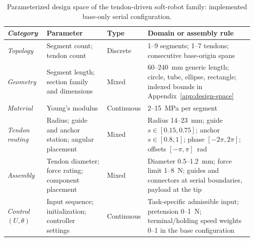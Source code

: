 \begin{table}[!t]
\centering
\caption{Parameterized design space of the tendon-driven soft-robot family: implemented base-only serial configuration.}
\label{tab:design-space}
\papertablestyle
\begin{tabularx}{\textwidth}{@{}>{\itshape}p{}!{\color{TraceGray}\vrule width 0.25pt}p{0.24\textwidth}p{0.10\textwidth}Y@{}}
\toprule
\normalfont\textbf{Category} & \textbf{Parameter} & \textbf{Type} & \textbf{Domain or assembly rule} \\
\midrule
Topology & Segment count; tendon count & Discrete & 1--9 segments; 1--7 tendons; consecutive base-origin spans \\
Geometry & Segment length; section family and dimensions & Mixed & 60--240~mm generic length; circle, tube, ellipse, rectangle; indexed bounds in Appendix~\ref{app:design-space} \\
Material & Young's modulus & Continuous & 2--15~MPa per segment \\
Tendon routing & Radius; guide and anchor station; angular placement & Mixed & Radius 14--23~mm; guide $s\in[0.15,0.75]$; anchor $s\in[0.8,1]$; phase $[-2\pi,2\pi]$; offsets $[-\pi,\pi]$~rad \\
Assembly & Tendon diameter; force rating; component placement & Mixed & Diameter 0.5--1.2~mm; force limit 1--8~N; guides and connectors at serial boundaries, payload at the tip \\
\midrule
Control $(U,\theta)$ & Input sequence; initialization; controller settings & Continuous & Task-specific admissible input; pretension 0--1~N; terminal/holding speed weights 0--1 in the base configuration \\
\bottomrule
\end{tabularx}
\end{table}
